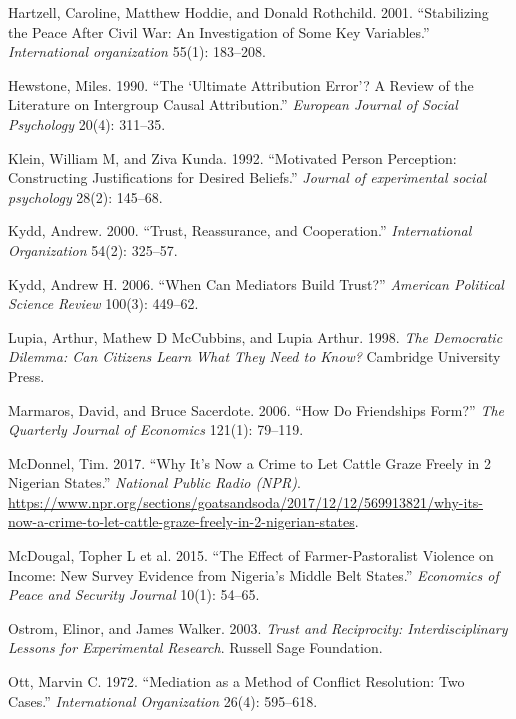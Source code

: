\documentclass[11pt]{article}
\begin{document}
\hypertarget{ref-hartzell2001stabilizing}{}
Hartzell, Caroline, Matthew Hoddie, and Donald Rothchild. 2001.
``Stabilizing the Peace After Civil War: An Investigation of Some Key
Variables.'' \emph{International organization} 55(1): 183--208.

\hypertarget{ref-hewstone1990ultimate}{}
Hewstone, Miles. 1990. ``The `Ultimate Attribution Error'? A Review of
the Literature on Intergroup Causal Attribution.'' \emph{European
Journal of Social Psychology} 20(4): 311--35.

\hypertarget{ref-klein1992motivated}{}
Klein, William M, and Ziva Kunda. 1992. ``Motivated Person Perception:
Constructing Justifications for Desired Beliefs.'' \emph{Journal of
experimental social psychology} 28(2): 145--68.

\hypertarget{ref-kydd2000trust}{}
Kydd, Andrew. 2000. ``Trust, Reassurance, and Cooperation.''
\emph{International Organization} 54(2): 325--57.

\hypertarget{ref-kydd2006can}{}
Kydd, Andrew H. 2006. ``When Can Mediators Build Trust?'' \emph{American
Political Science Review} 100(3): 449--62.

\hypertarget{ref-lupia1998democratic}{}
Lupia, Arthur, Mathew D McCubbins, and Lupia Arthur. 1998. \emph{The
Democratic Dilemma: Can Citizens Learn What They Need to Know?}
Cambridge University Press.

\hypertarget{ref-marmaros2006friendships}{}
Marmaros, David, and Bruce Sacerdote. 2006. ``How Do Friendships Form?''
\emph{The Quarterly Journal of Economics} 121(1): 79--119.

\hypertarget{ref-mcdonnel2017graze}{}
McDonnel, Tim. 2017. ``Why It's Now a Crime to Let Cattle Graze Freely
in 2 Nigerian States.'' \emph{National Public Radio (NPR)}.
\url{https://www.npr.org/sections/goatsandsoda/2017/12/12/569913821/why-its-now-a-crime-to-let-cattle-graze-freely-in-2-nigerian-states}.

\hypertarget{ref-mcdougal2015effect}{}
McDougal, Topher L et al. 2015. ``The Effect of Farmer-Pastoralist
Violence on Income: New Survey Evidence from Nigeria's Middle Belt
States.'' \emph{Economics of Peace and Security Journal} 10(1): 54--65.

\hypertarget{ref-ostrom2003trust}{}
Ostrom, Elinor, and James Walker. 2003. \emph{Trust and Reciprocity:
Interdisciplinary Lessons for Experimental Research}. Russell Sage
Foundation.

\hypertarget{ref-ott1972mediation}{}
Ott, Marvin C. 1972. ``Mediation as a Method of Conflict Resolution: Two
Cases.'' \emph{International Organization} 26(4): 595--618.
\end{document}
